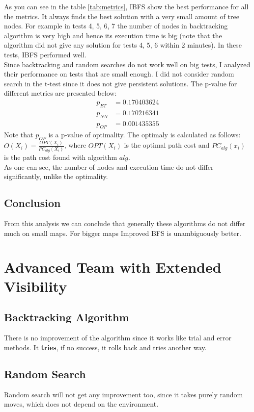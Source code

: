 \documentclass{article}
\begin{document}
As you can see in the table \ref{tab:metrics}, IBFS show the best performance for all the metrics. It always finds the best solution with a very small amount of tree nodes. For example in tests 4, 5, 6, 7 the number of nodes in backtracking algorithm is very high and hence its execution time is big (note that the algorithm did not give any solution for tests 4, 5, 6 within 2 minutes). In these tests, IBFS performed well.\\
Since backtracking and random searches do not work well on big tests, I analyzed their performance on tests that are small enough. I did not consider random search in the t-test since it does not give persistent solutions. The p-value for different metrics are presented below:
\begin{align}
	p_{ET} &= 0.170403624 \\
	p_{NN} &= 0.170216341 \\
	p_{OP} &= 0.001435355
\end{align}
Note that $p_{OP}$ is a p-value of optimality. The optimaly is calculated as follows: $O(X_i) = \frac{OPT(X_i)}{PC_{alg}(X_i)}$, where $OPT(X_i)$ is the optimal path cost and $PC_{alg}(x_i)$ is the path cost found with algorithm $alg$. \\
As one can see, the number of nodes and execution time do not differ significantly, unlike the optimality. 
\subsection{Conclusion}
From this analysis we can conclude that generally these algorithms do not differ much on small maps. For bigger maps Improved BFS is unambiguously better.

\section{Advanced Team with Extended Visibility}
\subsection{Backtracking Algorithm}
There is no improvement of the algorithm since it works like trial and error methods. It \textbf{tries}, if no success, it rolls back and tries another way. 
\subsection{Random Search}
Random search will not get any improvement too, since it takes purely random moves, which does not depend on the environment.
\end{document}

